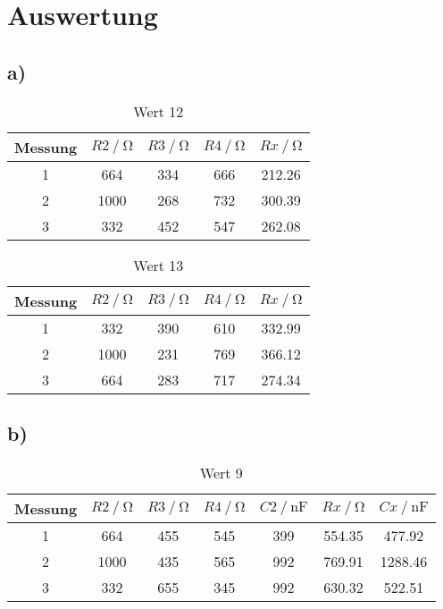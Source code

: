 \section{Auswertung}
\label{sec:Auswertung}
\subsection{a)}
\begin{table}
    \centering
    \caption{Wert 12 }
    \label{tab:}
    \begin{tabular}{c| c c c c}
        \toprule
{Messung} & {$R2 \:/\: \si{\ohm} $} & {$R3 \:/\: \si{\ohm}  $} & {$R4 \:/\: \si{\ohm}  $} & {$Rx \:/\: \si{\ohm} $}\\
        \midrule
 1 & 664 & 334 & 666 & 212.26\\
 2 & 1000 & 268 & 732  &  300.39\\
 3 & 332 & 452 & 547 & 262.08\\

      \bottomrule
    \end{tabular}
\end{table}


\begin{table}
    \centering
    \caption{Wert 13}
    \label{tab:}
    \begin{tabular}{c| c c c c}
        \toprule
       {Messung} &  {$R2 \:/\: \si{\ohm} $} & {$R3 \:/\: \si{\ohm}  $} & {$R4 \:/\: \si{\ohm}  $} & {$Rx \:/\: \si{\ohm} $}\\
        \midrule
 1 & 332 & 390 & 610 & 332.99\\
 2 & 1000 & 231 & 769 & 366.12\\
 3 & 664 & 283 & 717 & 274.34\\

      \bottomrule
    \end{tabular}
\end{table}

\subsection{b)}

\begin{table}
    \centering
    \caption{Wert 9}
    \label{tab:}
    \begin{tabular}{c| c c c c c c}
        \toprule
       {Messung} &  {$R2 \:/\: \si{\ohm} $} & {$R3 \:/\: \si{\ohm}  $} & {$R4 \:/\: \si{\ohm}  $} & {$C2 \:/\: \si{\nano\farad}  $} & {$Rx \:/\: \si{\ohm} $} &  {$Cx \:/\: \si{\nano\farad}$}\\
        \midrule
 1 & 664 & 455 & 545 & 399 & 554.35 & 477.92\\
 2 & 1000 & 435 & 565 & 992 & 769.91 & 1288.46\\
 3 & 332 & 655 & 345 & 992 & 630.32 & 522.51\\

      \bottomrule
    \end{tabular}
\end{table}

